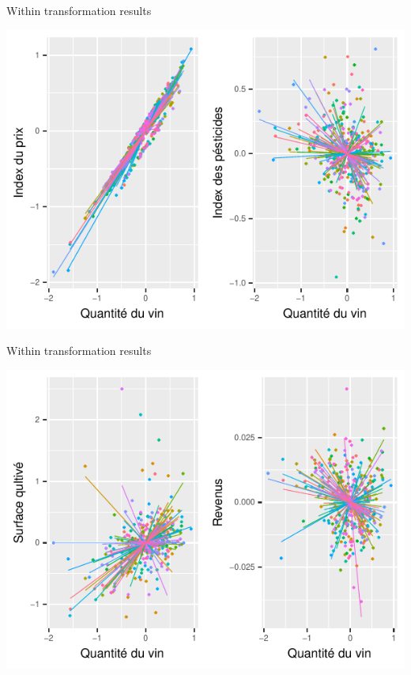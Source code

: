 \documentclass[11pt,ignorenonframetext,]{beamer}
\begin{document}
\begin{frame}{Within transformation results}
\protect\hypertarget{within-transformation-results}{}

\includegraphics{Presentation_files/figure-beamer/unnamed-chunk-22-1.pdf}

\end{frame}

\begin{frame}{Within transformation results}
\protect\hypertarget{within-transformation-results-1}{}

\includegraphics{Presentation_files/figure-beamer/unnamed-chunk-23-1.pdf}

\end{frame}
\end{document}
